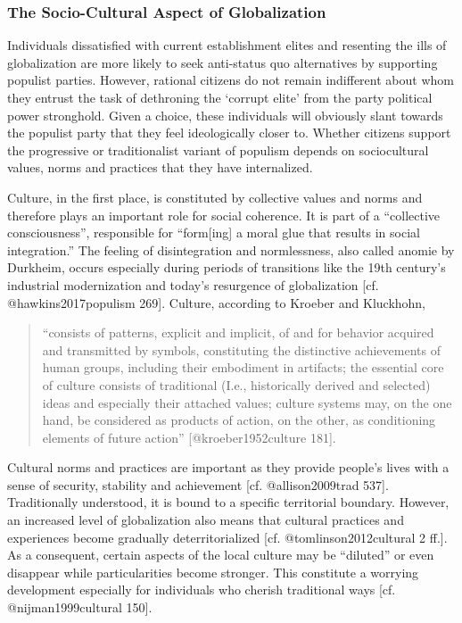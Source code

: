 \documentclass[]{article}
\begin{document}
\subsubsection{The Socio-Cultural Aspect of
Globalization}\label{the-socio-cultural-aspect-of-globalization}

Individuals dissatisfied with current establishment elites and resenting
the ills of globalization are more likely to seek anti-status quo
alternatives by supporting populist parties. However, rational citizens
do not remain indifferent about whom they entrust the task of dethroning
the `corrupt elite' from the party political power stronghold. Given a
choice, these individuals will obviously slant towards the populist
party that they feel ideologically closer to. Whether citizens support
the progressive or traditionalist variant of populism depends on
sociocultural values, norms and practices that they have internalized.

Culture, in the first place, is constituted by collective values and
norms and therefore plays an important role for social coherence. It is
part of a ``collective consciousness'', responsible for ``form{[}ing{]}
a moral glue that results in social integration.'' The feeling of
disintegration and normlessness, also called anomie by Durkheim, occurs
especially during periods of transitions like the 19th century's
industrial modernization and today's resurgence of globalization {[}cf.
@hawkins2017populism 269{]}. Culture, according to Kroeber and
Kluckhohn,

\begin{quote}
``consists of patterns, explicit and implicit, of and for behavior
acquired and transmitted by symbols, constituting the distinctive
achievements of human groups, including their embodiment in artifacts;
the essential core of culture consists of traditional (I.e.,
historically derived and selected) ideas and especially their attached
values; culture systems may, on the one hand, be considered as products
of action, on the other, as conditioning elements of future action''
{[}@kroeber1952culture 181{]}.
\end{quote}

Cultural norms and practices are important as they provide people's
lives with a sense of security, stability and achievement {[}cf.
@allison2009trad 537{]}. Traditionally understood, it is bound to a
specific territorial boundary. However, an increased level of
globalization also means that cultural practices and experiences become
gradually deterritorialized {[}cf. @tomlinson2012cultural 2 ff.{]}. As a
consequent, certain aspects of the local culture may be ``diluted'' or
even disappear while particularities become stronger. This constitute a
worrying development especially for individuals who cherish traditional
ways {[}cf. @nijman1999cultural 150{]}.
\end{document}

